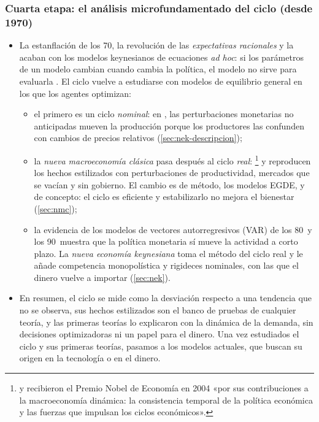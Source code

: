 \documentclass[11pt]{article}
\begin{document}
\subsubsection{Cuarta etapa: el análisis microfundamentado del ciclo (desde 1970)}\label{sec:microfundamentos}

\begin{itemize}
\item La estanflación de los 70, la revolución de las \emph{expectativas racionales} y la \nocite{Lucas1976Econometric} acaban con los modelos keynesianos de ecuaciones \emph{ad hoc}: si los parámetros de un modelo cambian cuando cambia la política, el modelo no sirve para evaluarla . El ciclo vuelve a estudiarse con modelos de equilibrio general en los que los agentes optimizan:
  \begin{itemize}
  \item el primero es un ciclo \emph{nominal}: en \textcite{Lucas1972Expectations}, las perturbaciones monetarias no anticipadas mueven la producción porque los productores las confunden con cambios de precios relativos (\ref{sec:nek-descripcion});
  \item la \emph{nueva macroeconomía clásica} pasa después al ciclo \emph{real}: \textcite{KydlandPrescott1982Time}\footnote{ y  recibieron el Premio Nobel de Economía en 2004 «por sus contribuciones a la macroeconomía dinámica: la consistencia temporal de la política económica y las fuerzas que impulsan los ciclos económicos»\nocite{Nobel2004KydlandPrescott}.} y \textcite{LongPlosser1983Real} reproducen los hechos estilizados con perturbaciones de productividad, mercados que se vacían y sin gobierno. El cambio es de método, los modelos EGDE, y de concepto: el ciclo es eficiente y estabilizarlo no mejora el bienestar (\ref{sec:nmc});
  \item la evidencia de los modelos de vectores autorregresivos (VAR) de los 80~y los 90~muestra que la política monetaria sí mueve la actividad a corto plazo\nocite{Sims1992Interpreting}. La \emph{nueva economía keynesiana} toma el método del ciclo real y le añade competencia monopolística y rigideces nominales, con las que el dinero vuelve a importar (\ref{sec:nek}).
  \end{itemize}
\item En resumen, el ciclo se mide como la desviación respecto a una tendencia que no se observa, sus hechos estilizados son el banco de pruebas de cualquier teoría, y las primeras teorías lo explicaron con la dinámica de la demanda, sin decisiones optimizadoras ni un papel para el dinero. Una vez estudiados el ciclo y sus primeras teorías, pasamos a los modelos actuales, que buscan su origen en la tecnología o en el dinero.
\end{itemize}
\end{document}
